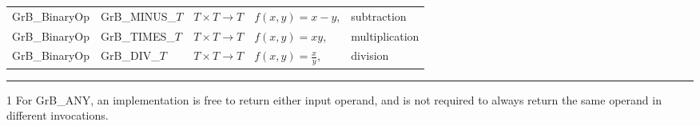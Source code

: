 \begin{table}
\begin{threeparttable}
\begin{tabular}{l|l|l|ll}
{\sf GrB\_BinaryOp}   & {\sf GrB\_MINUS\_$T$} & $T \times T \rightarrow T$  & $f(x,y) = x - y$, & subtraction \\
{\sf GrB\_BinaryOp}   & {\sf GrB\_TIMES\_$T$} & $T \times T \rightarrow T$  & $f(x,y) = xy$, & multiplication \\
{\sf GrB\_BinaryOp}   & {\sf GrB\_DIV\_$T$}   & $T \times T \rightarrow T$  & $f(x,y) = \frac{x}{y}$, & division \\
\end{tabular}
\hrule
\begin{tablenotes}
	\item[1] For {\sf GrB\_ANY}, an implementation is free to return either input operand, and is not required to always return the same operand in different invocations.
\end{tablenotes}
\end{threeparttable}
\end{table}


